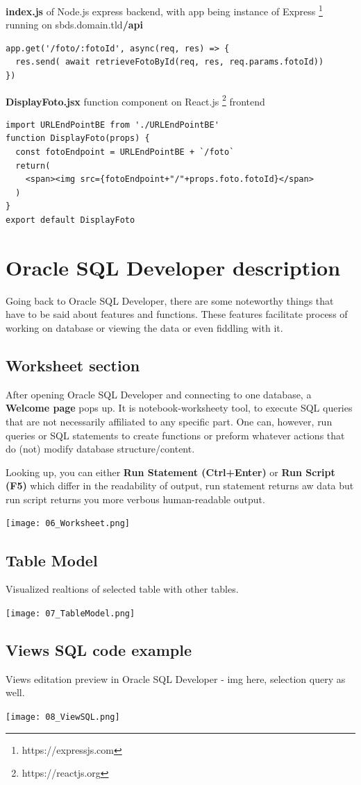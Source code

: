 \documentclass{article}
\begin{document}
\bigbreak
\textbf{index.js} of Node.js express backend, with app being instance of Express \footnote{https://expressjs.com} running on sbds.domain.tld\textbf{/api}
\begin{lstlisting}
app.get('/foto/:fotoId', async(req, res) => {
  res.send( await retrieveFotoById(req, res, req.params.fotoId))
})  
\end{lstlisting}
\textbf{DisplayFoto.jsx} function component on React.js \footnote{https://reactjs.org} frontend 
\begin{lstlisting}
import URLEndPointBE from './URLEndPointBE'
function DisplayFoto(props) {
  const fotoEndpoint = URLEndPointBE + `/foto`
  return(
    <span><img src={fotoEndpoint+"/"+props.foto.fotoId}</span>
  )
}
export default DisplayFoto
\end{lstlisting}
\section{Oracle SQL Developer description}
Going back to Oracle SQL Developer, there are some noteworthy things that have to be said about features and functions. These features facilitate process of working on database or viewing the data or even fiddling with it. 
\subsection*{Worksheet section} 
 After opening Oracle SQL Developer and connecting to one database, a \textbf{Welcome page} pops up. It is notebook-worksheety tool, to execute SQL queries that are not necessarily affiliated to any specific part. One can, however, run queries or SQL statements to create functions or preform whatever actions that do (not) modify database structure/content. \par
 \bigbreak
 Looking up, you can either \textbf{Run Statement (Ctrl+Enter)} or \textbf{Run Script (F5)} which differ in the readability of output, run statement returns  aw data but run script returns you more verbous human-readable output. \par
\bigbreak
\texttt{[image: 06\_Worksheet.png]}
\newpage
\subsection*{Table Model} 
Visualized realtions of selected table with other tables. \par
\texttt{[image: 07\_TableModel.png]}
\subsection*{Views SQL code example}
Views editation preview in Oracle SQL Developer - img here, selection query as well. \par
\texttt{[image: 08\_ViewSQL.png]}
\end{document}
